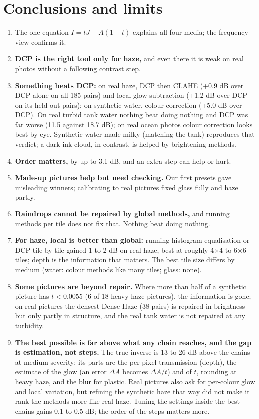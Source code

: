 \documentclass[10pt,a4paper]{article}
\begin{document}
\section{Conclusions and limits}
\begin{enumerate}
\item The one equation $I=tJ+A(1-t)$ explains all four media; the frequency view confirms it.
\item \textbf{DCP is the right tool only for haze,} and even there it is weak on real photos without a following contrast step.
\item \textbf{Something beats DCP:} on real haze, DCP then CLAHE (+0.9 dB over DCP alone on all 185 pairs) and local-glow subtraction (+1.2 dB over DCP on its held-out pairs); on synthetic water, colour correction (+5.0 dB over DCP). On real turbid tank water nothing beat doing nothing and DCP was far worse (11.5 against 18.7 dB); on real ocean photos colour correction looks best by eye. Synthetic water made milky (matching the tank) reproduces that verdict; a dark ink cloud, in contrast, is helped by brightening methods.
\item \textbf{Order matters,} by up to 3.1 dB, and an extra step can help or hurt.
\item \textbf{Made-up pictures help but need checking.} Our first presets gave misleading winners; calibrating to real pictures fixed glass fully and haze partly.
\item \textbf{Raindrops cannot be repaired by global methods,} and running methods per tile does not fix that. Nothing beat doing nothing.
\item \textbf{For haze, local is better than global:} running histogram equalisation or DCP tile by tile gained 1 to 2 dB on real haze, best at roughly 4$\times$4 to 6$\times$6 tiles; depth is the information that matters. The best tile size differs by medium (water: colour methods like many tiles; glass: none).
\item \textbf{Some pictures are beyond repair.} Where more than half of a synthetic picture has $t<0.0055$ (6 of 18 heavy-haze pictures), the information is gone; on real pictures the densest Dense-Haze (38 pairs) is repaired in brightness but only partly in structure, and the real tank water is not repaired at any turbidity.
\item \textbf{The best possible is far above what any chain reaches, and the gap is estimation, not steps.} The true inverse is 13 to 26 dB above the chains at medium severity; its parts are the per-pixel transmission (depth), the estimate of the glow (an error $\Delta A$ becomes $\Delta A/t$) and of $t$, rounding at heavy haze, and the blur for plastic. Real pictures also ask for per-colour glow and local variation, but refining the synthetic haze that way did not make it rank the methods more like real haze. Tuning the settings inside the best chains gains 0.1 to 0.5 dB; the order of the steps matters more.
\end{enumerate}
\end{document}
